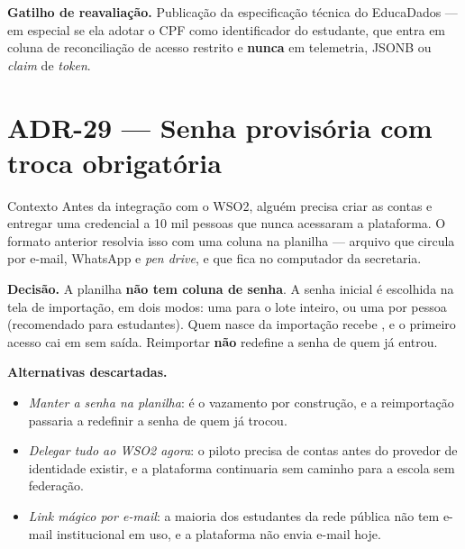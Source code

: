 \textbf{Gatilho de reavaliação.} Publicação da especificação técnica do
EducaDados --- em especial se ela adotar o CPF como identificador do estudante,
que entra em coluna de reconciliação de acesso restrito e \textbf{nunca} em
telemetria, JSONB ou \emph{claim} de \emph{token}.

\section{ADR-29 --- Senha provisória com troca obrigatória}
\label{adr:senha-provisoria}

\begin{especificacao}{Contexto}
Antes da integração com o WSO2, alguém precisa criar as contas e entregar uma
credencial a 10 mil pessoas que nunca acessaram a plataforma. O formato anterior
resolvia isso com uma coluna  na planilha --- arquivo que circula por
e-mail, WhatsApp e \emph{pen drive}, e que fica no computador da secretaria.
\end{especificacao}

\textbf{Decisão.} A planilha \textbf{não tem coluna de senha}. A senha inicial é
escolhida na tela de importação, em dois modos: uma para o lote inteiro, ou uma
por pessoa (recomendado para estudantes). Quem nasce da importação recebe
, e o primeiro acesso cai em 
sem saída. Reimportar \textbf{não} redefine a senha de quem já entrou.

\textbf{Alternativas descartadas.}
\begin{itemize}
  \item \emph{Manter a senha na planilha}: é o vazamento por construção, e a
    reimportação passaria a redefinir a senha de quem já trocou.
  \item \emph{Delegar tudo ao WSO2 agora}: o piloto precisa de contas antes do
    provedor de identidade existir, e a plataforma continuaria sem caminho para a
    escola sem federação.
  \item \emph{Link mágico por e-mail}: a maioria dos estudantes da rede pública não
    tem e-mail institucional em uso, e a plataforma não envia e-mail hoje.
\end{itemize}

